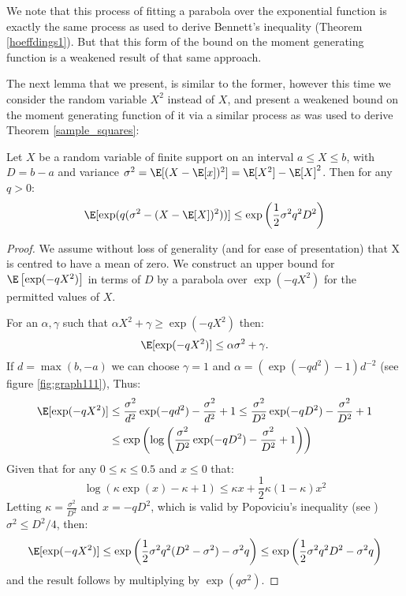 We note that this process of fitting a parabola over the exponential function is exactly the same process as used to derive Bennett's inequality (Theorem \ref{hoeffdings1}).
But that this form of the bound on the moment generating function is a weakened result of that same approach.

The next lemma that we present, is similar to the former, however this time we consider the random variable $X^2$ instead of $X$, and present a weakened bound on the moment generating function of it via a similar process as was used to derive Theorem \ref{sample_squares}: 

\begin{lemma}\label{expectation2}
Let $X$ be a random variable of finite support on an interval $a\le X\le b$, with $D=b-a$ and variance $\sigma^2 = \E[(X-\E[x])^2] = \E[X^2]-\E[X]^2$. Then for any $q>0$:
$$\E[\exp(q(\sigma^2-(X-\E[X])^2))] \le \exp\left(\frac{1}{2}\sigma^2q^2D^2\right)$$
\end{lemma}
\begin{proof}
We assume without loss of generality (and for ease of presentation) that X is centred to have a mean of zero.
We construct an upper bound for $\E\left[\exp(-qX^2)\right]$ in terms of $D$ by a parabola over $\exp(-qX^2)$ for the permitted values of $X$.

For an $\alpha,\gamma$ such that $\alpha X^2+\gamma\ge \exp(-qX^2)$ then:
$$ \E[\exp(-qX^2)] \le \alpha \sigma^2 + \gamma.$$
If $d=\max(b,-a)$ we can choose $\gamma=1$ and $\alpha=(\exp(-q d^2)-1)d^{-2}$ (see figure \ref{fig:graph111}), Thus:
\begin{align*}
\E[\exp(-q X^2)] &\le \frac{\sigma^2}{d^2}\exp(-q d^2)-\frac{\sigma^2}{d^2} + 1\le \frac{\sigma^2}{D^2}\exp(-q D^2)-\frac{\sigma^2}{D^2} + 1 \\
&\le \exp\left(\log\left(\frac{\sigma^2}{D^2}\exp(-q D^2)-\frac{\sigma^2}{D^2} + 1\right)\right)
\end{align*}
Given that for any $0\le \kappa \le 0.5$ and $x\le 0$ that: $$\log\left(\kappa\exp(x)-\kappa + 1\right) \le \kappa x+\frac{1}{2}\kappa(1-\kappa)x^2$$
Letting $\kappa=\frac{\sigma^2}{D^2}$ and $x=-qD^2$, which is valid by Popoviciu's inequality (see \cite{zbMATH05780164}) $\sigma^2\le D^2/4$, then:
$$ \E[\exp(-q X^2)] \le \exp\left(\frac{1}{2}\sigma^2q^2(D^2-\sigma^2)-\sigma^2q\right) \le \exp\left(\frac{1}{2}\sigma^2q^2D^2-\sigma^2q\right)$$
and the result follows by multiplying by $\exp(q\sigma^2)$.
\end{proof}

